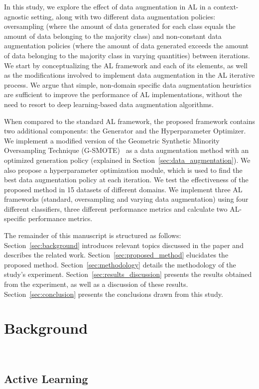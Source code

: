 \documentclass[10pt,journal,compsoc]{IEEEtran}
\begin{document}
In this study, we explore the effect of data augmentation in AL in a
context-agnostic setting, along with two different data augmentation policies:
oversampling (where the amount of data generated for each class equals the
amount of data belonging to the majority class) and non-constant data
augmentation policies (where the amount of data generated exceeds the amount
of data belonging to the majority class in varying quantities) between
iterations. We start by conceptualizing the AL framework and each of its
elements, as well as the modifications involved to implement data augmentation
in the AL iterative process. We argue that simple, non-domain specific data
augmentation heuristics are sufficient to improve the performance of AL
implementations, without the need to resort to deep learning-based data
augmentation algorithms.

When compared to the standard AL framework, the proposed framework contains
two additional components: the Generator and the Hyperparameter Optimizer. We
implement a modified version of the Geometric Synthetic Minority Oversampling
Technique (G-SMOTE)~\cite{Douzas2019} as a data augmentation method with an
optimized generation policy (explained in
Section~\ref{sec:data_augmentation}). We also propose a hyperparameter
optimization module, which is used to find the best data augmentation policy
at each iteration. We test the effectiveness of the proposed method in 15
datasets of different domains. We implement three AL frameworks (standard,
oversampling and varying data augmentation) using four different classifiers,
three different performance metrics and calculate two AL-specific performance
metrics. 

The remainder of this manuscript is structured as follows:
Section~\ref{sec:background} introduces relevant topics discussed in the paper
and describes the related work. Section~\ref{sec:proposed_method} elucidates
the proposed method. Section~\ref{sec:methodology} details the methodology of
the study's experiment. Section~\ref{sec:results_discussion} presents the
results obtained from the experiment, as well as a discussion of these
results. Section~\ref{sec:conclusion} presents the conclusions drawn from
this study.
 
\section{Background}~\label{sec:background}

\subsection{Active Learning}~\label{sec:active_learning_methods}
\end{document}
